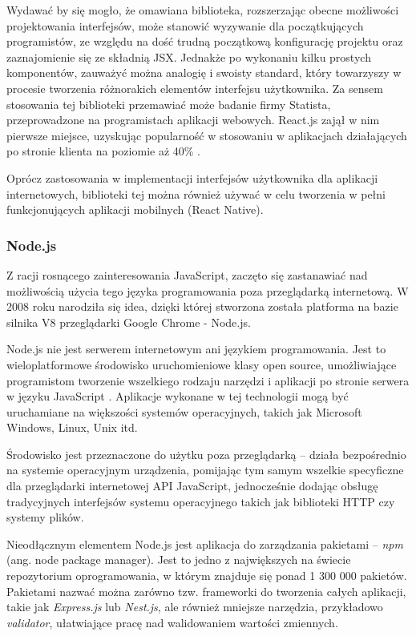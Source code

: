\documentclass[12pt,twoside]{article}
\begin{document}
Wydawać by się mogło, że omawiana biblioteka, rozszerzając obecne możliwości projektowania interfejsów, może stanowić wyzywanie dla początkujących programistów, ze względu na dość trudną początkową konfigurację projektu oraz zaznajomienie się ze składnią JSX. Jednakże po wykonaniu kilku prostych komponentów, zauważyć można analogię i swoisty standard, który towarzyszy w procesie tworzenia różnorakich elementów interfejsu użytkownika. Za sensem stosowania tej biblioteki przemawiać może badanie firmy Statista, przeprowadzone na programistach aplikacji webowych. React.js zajął w nim pierwsze miejsce, uzyskując popularność w stosowaniu w aplikacjach działających po stronie klienta na poziomie aż 40\% \cite{ReactPopular}.

Oprócz zastosowania w implementacji interfejsów użytkownika dla aplikacji internetowych, biblioteki tej można również używać w celu tworzenia w pełni funkcjonujących aplikacji mobilnych (React Native).

\subsubsection{Node.js}

Z racji rosnącego zainteresowania JavaScript, zaczęto się zastanawiać nad możliwością użycia tego języka programowania poza przeglądarką internetową. W 2008 roku narodziła się idea, dzięki której stworzona została platforma na bazie silnika V8 przeglądarki Google Chrome - Node.js. 

Node.js nie jest serwerem internetowym ani językiem programowania. Jest to wieloplatformowe środowisko uruchomieniowe klasy open source, umożliwiające programistom tworzenie wszelkiego rodzaju narzędzi i aplikacji po stronie serwera w języku JavaScript \cite{NodejsWhatIs}. Aplikacje wykonane w tej technologii mogą być uruchamiane na większości systemów operacyjnych, takich jak Microsoft Windows, Linux, Unix itd.

Środowisko jest przeznaczone do użytku poza przeglądarką -- działa bezpośrednio na systemie operacyjnym urządzenia, pomijając tym samym wszelkie specyficzne dla przeglądarki internetowej API JavaScript, jednocześnie dodając obsługę tradycyjnych interfejsów systemu operacyjnego takich jak biblioteki HTTP czy systemy plików.

Nieodłącznym elementem Node.js jest aplikacja do zarządzania pakietami -- \emph{npm} (ang. node package manager). Jest to jedno z największych na świecie repozytorium oprogramowania, w którym znajduje się ponad 1 300 000 pakietów. Pakietami nazwać można zarówno tzw. frameworki do tworzenia całych aplikacji, takie jak \emph{Express.js} lub \emph{Nest.js}, ale również mniejsze narzędzia, przykładowo \emph{validator}, ułatwiające pracę nad walidowaniem wartości zmiennych.
\end{document}
